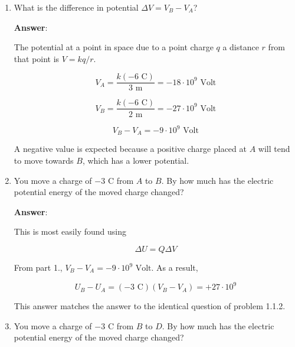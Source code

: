 \documentclass{article}
\begin{document}
\begin{enumerate}

  \item What is the difference in potential $\Delta V = V_B-V_A$?

        \ifsolutions
          \textbf{Answer}:
        
          The potential at a point in space due to a point charge $q$ a distance $r$ from that point is $V={kq}/{r}$.
        
          \begin{equation}V_A=\frac{k(-6\text{ C})}{3\text { m}}=-18\cdot 10^9\text{ Volt}\end{equation}
        
          \begin{equation}V_B=\frac{k(-6\text{ C})}{2\text { m}}=-27\cdot 10^9\text{ Volt}\end{equation}
        
          \begin{equation}V_B-V_A=-9\cdot 10^9\text{ Volt}\end{equation}
        
          A negative value is expected because a positive charge placed at $A$ will tend to move towards $B$, which has a lower potential.
        \fi

  \item You move a charge of $-3\text{ C}$ from $A$ to $B$. By how much has the electric potential energy of the moved charge changed?

        \ifsolutions
          \textbf{Answer}:
        
          This is most easily found using
        
          \begin{equation}\Delta U = Q{\Delta V}\end{equation}
        
          From part 1., $V_B-V_A=-9\cdot 10^9\text{ Volt}$. As a result, 
        
          \begin{equation}U_B-U_A= (-3\text{ C})(V_B-V_A)=+27\cdot 10^9\end{equation}
        
          This answer matches the answer to the identical question of problem 1.1.2.
        \fi

  \item You move a charge of $-3\text{ C}$ from $B$ to $D$. By how much has the electric potential energy of the moved charge changed?


\end{enumerate}
\end{document}
